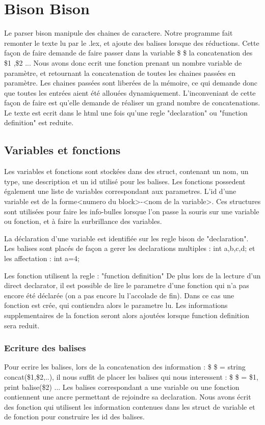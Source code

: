 \documentclass{report}
\begin{document}
		\section{Bison Bison}{
		 Le parser bison manipule des chaines de caractere. Notre programme fait remonter le texte lu par le .lex, et ajoute des balises lorsque des réductions. Cette façon de faire demande de 
		 faire passer dans la variable \$ \$ la concatenation des \$1 ,\$2 ... Nous avons donc ecrit une fonction prenant un nombre variable de paramètre, et retournant la concatenation de toutes
		 les chaines passées en paramètre. Les chaines passées sont liberées de la mémoire, ce qui demande donc que toutes les entrées aient été allouées dynamiquement.
		 L'inconveniant de cette façon de faire est qu'elle demande de réaliser un grand nombre de concatenations.
		 Le texte est ecrit dans le html une fois qu'une regle "declaration" ou "function definition" est reduite.
			\subsection{Variables et fonctions}{
			Les variables et fonctions sont stockées dans des struct, contenant un nom, un type, une description et un id utilisé pour les balises. Les fonctions possedent également une liste 
			de variables correspondant aux parametres. L'id d'une variable est de la forme<numero du block>-<nom de la variable>.
			Ces structures sont utilisées pour faire les info-bulles lorsque l'on passe la souris sur une variable ou fonction, et à faire la surbrillance des variables.
			
			La déclaration d'une variable est identifiée sur les regle bison de "declaration". Les balises sont placés de façon a gerer les declarations multiples : int a,b,c,d;
			et les affectation : int a=4;
			
			Les fonction utilisent la regle : "function definition"
			De plus lors de la lecture d'un direct declarator, il est possible de lire le parametre d'une fonction qui n'a pas encore été déclarée (on a pas encore lu l'accolade de fin). Dans ce cas
			une fonction est crée, qui contiendra alors le parametre lu. Les informations supplementaires de la fonction seront alors ajoutées lorsque function definition sera reduit.
			\subsubsection{Ecriture des balises}{
			Pour ecrire les balises, lors de la concatenation des information : \$ \$ = string concat(\$1,\$2,..), 
			il nous suffit de placer les balises qui nous interessent : \$ \$ = \$1, print balise(\$2) ...
			Les balises correspondant a une variable ou une fonction contiennent une ancre permettant de rejoindre sa declaration. Nous avons écrit des fonction qui utilisent les information
			contenues dans les struct de variable et de fonction pour construire les id des balises. 	
		}
}}
\end{document}
